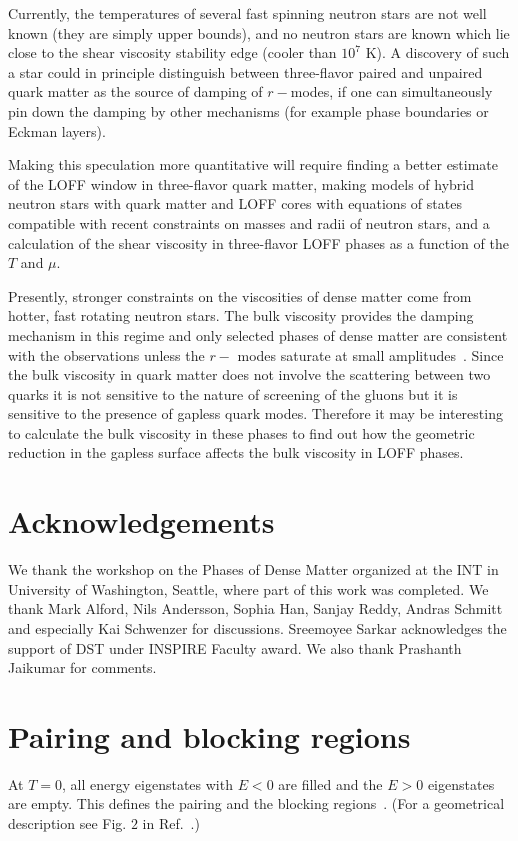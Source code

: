 \documentclass[10pt, aps, prd, superscriptaddress, nofootinbib, 
               amsmath, amssymb, twocolumn,
               preprintnumbers, showpacs,
               raggedbottom,
               floatfix]{revtex4-1}
\begin{document}
Currently, the temperatures of several fast spinning neutron stars are not well
known (they are simply upper bounds), and no neutron stars are known which lie
close to the shear viscosity stability edge (cooler than $10^7$ K). A discovery
of such a star could in principle distinguish between three-flavor paired and unpaired
quark matter as the source of damping of $r-$modes, if one can simultaneously
pin down the damping by other mechanisms (for example phase boundaries or 
Eckman layers).

Making this speculation more quantitative will require finding a better
estimate of the LOFF window in three-flavor quark matter, making models of
hybrid neutron stars with quark matter and LOFF cores with equations of states
compatible with recent constraints on masses and radii of neutron stars, and a
calculation of the shear viscosity in three-flavor LOFF phases as a
function of the $T$ and $\mu$.   

Presently, stronger constraints on the viscosities of dense matter come from
hotter, fast rotating neutron stars. The bulk viscosity provides the damping
mechanism in this regime and only selected phases of dense matter are
consistent with the observations unless the $r-$ modes saturate at small
amplitudes~\cite{Alford:2013pma}. Since the bulk viscosity in quark matter does
not involve the scattering between two quarks it is not sensitive to the nature
of screening of the gluons but it is sensitive to the presence of
gapless quark modes. Therefore it may be interesting to calculate the bulk
viscosity in these phases to find out how the geometric reduction in the
gapless surface affects the bulk viscosity in LOFF phases.


\section{Acknowledgements}
We thank the workshop on the Phases of Dense Matter organized at the INT in
University of Washington, Seattle, where part of this work was completed. We
thank Mark Alford, Nils Andersson, Sophia Han, Sanjay Reddy, Andras Schmitt and especially Kai
Schwenzer for discussions. Sreemoyee Sarkar acknowledges the support of DST under INSPIRE Faculty award.
We also thank Prashanth Jaikumar for comments.

\appendix

\section{Pairing and blocking regions}
\label{sec:blocking}
At $T=0$, all energy eigenstates with $E<0$ are filled and the $E>0$
eigenstates are empty. This defines the pairing and the blocking
regions~\cite{Alford:2000ze,Bowers:2003ye}. (For a geometrical description 
see Fig. $2$ in Ref.~\cite{Alford:2000ze}.)
\end{document}

